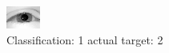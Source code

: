\begin{figure}[h!]
\begin{center}
\includegraphics[width=0.60\columnwidth]{figures/ID2341_class_1_target_2.png}
\end{center}
\caption{ Classification: 1 actual target: 2}
\label{fig:ID2341_class_1_target_2}
\end{figure}
